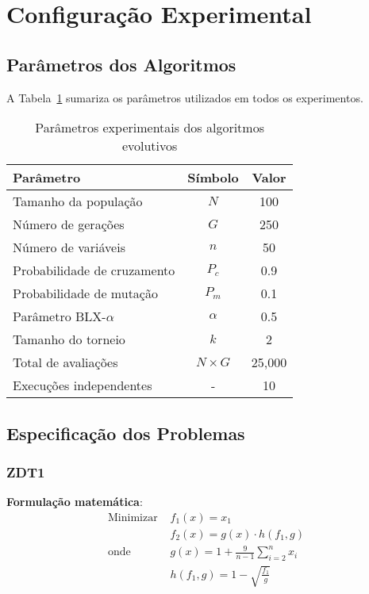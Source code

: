 
\section{Configuração Experimental}

\subsection{Parâmetros dos Algoritmos}

A Tabela~\ref{tab:parameters} sumariza os parâmetros utilizados em todos os experimentos.

\begin{table}[H]
\centering
\caption{Parâmetros experimentais dos algoritmos evolutivos}
\label{tab:parameters}
\begin{tabular}{@{}lcc@{}}
\toprule
\textbf{Parâmetro} & \textbf{Símbolo} & \textbf{Valor} \\
\midrule
Tamanho da população & $N$ & 100 \\
Número de gerações & $G$ & 250 \\
Número de variáveis & $n$ & 50 \\
Probabilidade de cruzamento & $P_c$ & 0.9 \\
Probabilidade de mutação & $P_m$ & 0.1 \\
Parâmetro BLX-$\alpha$ & $\alpha$ & 0.5 \\
Tamanho do torneio & $k$ & 2 \\
\midrule
Total de avaliações & $N \times G$ & 25{,}000 \\
Execuções independentes & - & 10 \\
\bottomrule
\end{tabular}
\end{table}

\subsection{Especificação dos Problemas}

\subsubsection{ZDT1}

\textbf{Formulação matemática}:
\begin{align*}
\text{Minimizar } & f_1(x) = x_1 \\
                  & f_2(x) = g(x) \cdot h(f_1, g) \\
\text{onde } & g(x) = 1 + \frac{9}{n-1}\sum_{i=2}^{n} x_i \\
             & h(f_1, g) = 1 - \sqrt{\frac{f_1}{g}}
\end{align*}


